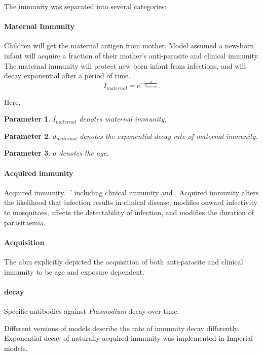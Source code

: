 \documentclass[a4paper, 12pt, twoside]{article}
\newtheorem{parameter}{Parameter}
\begin{document}
The immunity was separated into several categories:

\paragraph{Maternal Immunity}%
\label{par:maternal_immunity}
Children will get the maternal antigen from mother.
Model assumed a new-born infant will acquire a fraction of their mother’s anti-parasite and clinical immunity.
The maternal immunity will protect new born infant from infections, and will decay exponential after a period of time.
\[
  I_{maternal} = e^{- \frac{a}{d_{maternal}}}
.\] 

Here,

\begin{parameter}
  {$I_{maternal}$}
{denotes maternal immunity.}
\end{parameter}
\begin{parameter}
  {$d_{maternal}$}
{denotes the exponential decay rate of maternal immunity.}
\end{parameter}
\begin{parameter}
{$a$}
{denotes the age.}
\end{parameter}

\paragraph{Acquired immunity}%
\label{par:acquired_immunity}
Acquired immunity.`\ ' including clinical immunity and .
Acquired immunity alters the likelihood that infection results in clinical disease, modifies onward infectivity to mosquitoes, affects the detectability of infection, and modifies the duration of parasitaemia.

\paragraph{Acquisition}%
\label{par:acquisition}
The \gls{abm} explicitly depicted the acquisition of both anti-parasite and clinical immunity to be age and exposure dependent.

\paragraph{decay}%
\label{par:decay}
Specific antibodies against \textit{Plasmodium} decay over time.

Different versions of models describe the rate of immunity decay differently.
Exponential decay of naturally acquired immunity was implemented in Imperial models.
\end{document}
